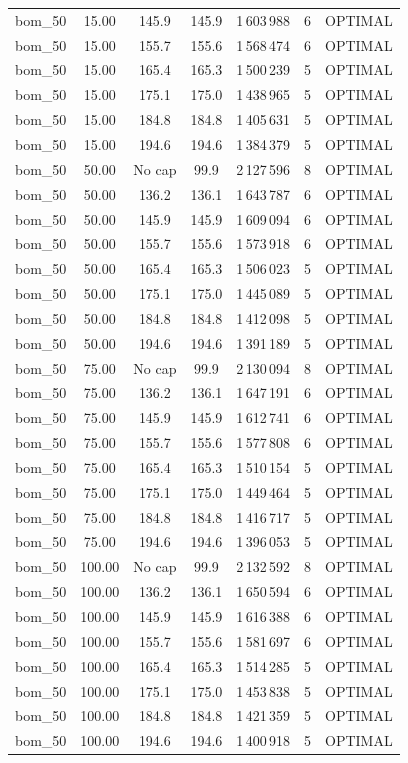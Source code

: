 \begin{table}[!htbp]
\begin{tabular}{lcccccc}
bom\_50 & 15.00 & 145.9 & 145.9 & 1\,603\,988 & 6 & OPTIMAL \\
bom\_50 & 15.00 & 155.7 & 155.6 & 1\,568\,474 & 6 & OPTIMAL \\
bom\_50 & 15.00 & 165.4 & 165.3 & 1\,500\,239 & 5 & OPTIMAL \\
bom\_50 & 15.00 & 175.1 & 175.0 & 1\,438\,965 & 5 & OPTIMAL \\
bom\_50 & 15.00 & 184.8 & 184.8 & 1\,405\,631 & 5 & OPTIMAL \\
bom\_50 & 15.00 & 194.6 & 194.6 & 1\,384\,379 & 5 & OPTIMAL \\
bom\_50 & 50.00 & No cap & 99.9 & 2\,127\,596 & 8 & OPTIMAL \\
bom\_50 & 50.00 & 136.2 & 136.1 & 1\,643\,787 & 6 & OPTIMAL \\
bom\_50 & 50.00 & 145.9 & 145.9 & 1\,609\,094 & 6 & OPTIMAL \\
bom\_50 & 50.00 & 155.7 & 155.6 & 1\,573\,918 & 6 & OPTIMAL \\
bom\_50 & 50.00 & 165.4 & 165.3 & 1\,506\,023 & 5 & OPTIMAL \\
bom\_50 & 50.00 & 175.1 & 175.0 & 1\,445\,089 & 5 & OPTIMAL \\
bom\_50 & 50.00 & 184.8 & 184.8 & 1\,412\,098 & 5 & OPTIMAL \\
bom\_50 & 50.00 & 194.6 & 194.6 & 1\,391\,189 & 5 & OPTIMAL \\
bom\_50 & 75.00 & No cap & 99.9 & 2\,130\,094 & 8 & OPTIMAL \\
bom\_50 & 75.00 & 136.2 & 136.1 & 1\,647\,191 & 6 & OPTIMAL \\
bom\_50 & 75.00 & 145.9 & 145.9 & 1\,612\,741 & 6 & OPTIMAL \\
bom\_50 & 75.00 & 155.7 & 155.6 & 1\,577\,808 & 6 & OPTIMAL \\
bom\_50 & 75.00 & 165.4 & 165.3 & 1\,510\,154 & 5 & OPTIMAL \\
bom\_50 & 75.00 & 175.1 & 175.0 & 1\,449\,464 & 5 & OPTIMAL \\
bom\_50 & 75.00 & 184.8 & 184.8 & 1\,416\,717 & 5 & OPTIMAL \\
bom\_50 & 75.00 & 194.6 & 194.6 & 1\,396\,053 & 5 & OPTIMAL \\
bom\_50 & 100.00 & No cap & 99.9 & 2\,132\,592 & 8 & OPTIMAL \\
bom\_50 & 100.00 & 136.2 & 136.1 & 1\,650\,594 & 6 & OPTIMAL \\
bom\_50 & 100.00 & 145.9 & 145.9 & 1\,616\,388 & 6 & OPTIMAL \\
bom\_50 & 100.00 & 155.7 & 155.6 & 1\,581\,697 & 6 & OPTIMAL \\
bom\_50 & 100.00 & 165.4 & 165.3 & 1\,514\,285 & 5 & OPTIMAL \\
bom\_50 & 100.00 & 175.1 & 175.0 & 1\,453\,838 & 5 & OPTIMAL \\
bom\_50 & 100.00 & 184.8 & 184.8 & 1\,421\,359 & 5 & OPTIMAL \\
bom\_50 & 100.00 & 194.6 & 194.6 & 1\,400\,918 & 5 & OPTIMAL \\
\bottomrule
\end{tabular}
\end{table}
